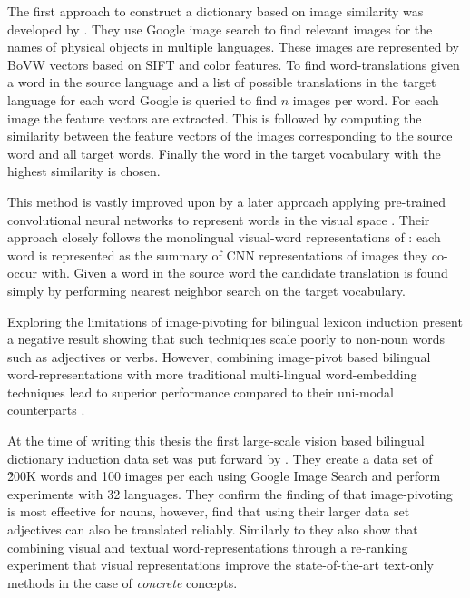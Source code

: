 The first approach to construct a dictionary based on image similarity was
developed by \cite{bergsma2011learning}. They use Google image search to find
relevant images for the names of physical objects in multiple languages.
These images are represented by BoVW vectors based
on SIFT and color features. To find word-translations given a word in the
source language and a list of possible translations in the target language
for each word Google is queried to find $n$ images per word. For each image the
feature vectors are extracted. This is followed by computing the similarity
between the feature vectors of the images corresponding to the source word and
all target words. Finally the word in the target vocabulary with the highest
similarity is chosen.

This method is vastly improved upon by a later approach applying
pre-trained convolutional neural networks to represent words
in the visual space \citep{kiela2015visual}. Their approach closely follows
the monolingual visual-word representations of \cite{kiela2014improving}:
each word is represented as the summary of CNN representations of images they
co-occur with. Given a word in the source word the candidate translation is found
simply by performing nearest neighbor search on the target vocabulary.

Exploring the limitations of image-pivoting for bilingual lexicon induction
\cite{hartmann2017limitations} present a negative result
showing that such techniques scale poorly to non-noun words such as
adjectives or verbs. However, combining image-pivot based bilingual
word-representations with more traditional multi-lingual word-embedding
techniques lead to superior performance compared to their uni-modal
counterparts \cite{vulic2016multi}. 

At the time of writing this thesis
the first large-scale vision based bilingual dictionary induction data set
was put forward by \citep{hewitt2018learning}. They create a data set
of \~200K words and 100 images per each using Google Image Search and perform
experiments with 32 languages.
They confirm the finding of \cite{hartmann2017limitations} that image-pivoting
is most effective for nouns, however, find that using their larger data set
adjectives can also be translated reliably. Similarly to \cite{vulic2016multi}
they also show that combining
visual and textual word-representations through a re-ranking
experiment that visual representations improve the state-of-the-art
text-only methods in the case of \emph{concrete} concepts.

